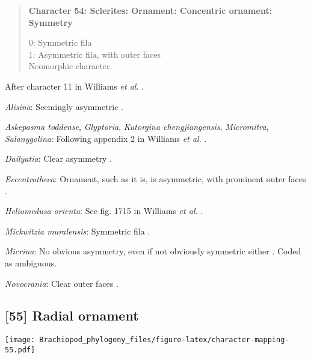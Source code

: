 \documentclass[openany]{book}
\theoremstyle{definition}
\theoremstyle{definition}
\theoremstyle{definition}
\theoremstyle{remark}
\begin{document}
\begin{quote}
\textbf{Character 54: Sclerites: Ornament: Concentric ornament:
Symmetry}

0: Symmetric fila\\
1: Asymmetric fila, with outer faces\\
Neomorphic character.
\end{quote}

After character 11 in Williams \emph{et al}.
\citeyearpar{Williams1998Thediversity}.

\hypertarget{Alisina-coding-54}{}
\emph{Alisina}: Seemingly asymmetric \citetext{\citealp[fig.
122.3c]{Williams2000LinguliformeaCraniiformea}; \citealp[Fig.
1]{Zhang2011Anobolellate}}.

\hypertarget{Askepasma_toddense-coding-54}{}
\emph{Askepasma toddense}, \emph{Glyptoria}, \emph{Kutorgina
chengjiangensis}, \emph{Micromitra}, \emph{Salanygolina}: Following
appendix 2 in Williams \emph{et al}.
\citeyearpar{Williams1998Thediversity}.

\hypertarget{Dailyatia-coding-54}{}
\emph{Dailyatia}: Clear asymmetry \citep{Skovsted2015Theearly}.

\hypertarget{Eccentrotheca-coding-54}{}
\emph{Eccentrotheca}: Ornament, such as it is, is asymmetric, with
prominent outer faces \citep{Skovsted2011Scleritomeconstruction}.

\hypertarget{Heliomedusa_orienta-coding-54}{}
\emph{Heliomedusa orienta}: See fig. 1715 in Williams \emph{et al}.
\citeyearpar{Williams2007Supplement}.

\hypertarget{Mickwitzia_muralensis-coding-54}{}
\emph{Mickwitzia muralensis}: Symmetric fila
\citep{Balthasar2004Shellstructure}.

\hypertarget{Micrina-coding-54}{}
\emph{Micrina}: No obvious asymmetry, even if not obviously symmetric
either \citep{Holmer2008TheEarly}. Coded as ambiguous.

\hypertarget{Novocrania-coding-54}{}
\emph{Novocrania}: Clear outer faces \citep[fig.
100.2b]{Williams2000LinguliformeaCraniiformea}.

\subsection*{{[}55{]} Radial ornament}\label{radial-ornament}

\texttt{[image: Brachiopod\_phylogeny\_files/figure-latex/character-mapping-55.pdf]}
\end{document}
